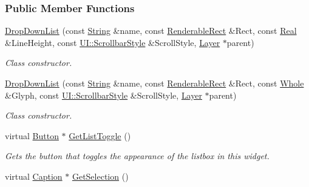 \subsubsection*{Public Member Functions}
\begin{DoxyCompactItemize}
\item 
\hyperlink{classMezzanine_1_1UI_1_1DropDownList_a62db40919995b782f115b45e740eec76}{DropDownList} (const \hyperlink{namespaceMezzanine_acf9fcc130e6ebf08e3d8491aebcf1c86}{String} \&name, const \hyperlink{structMezzanine_1_1UI_1_1RenderableRect}{RenderableRect} \&Rect, const \hyperlink{namespaceMezzanine_a726731b1a7df72bf3583e4a97282c6f6}{Real} \&LineHeight, const \hyperlink{namespaceMezzanine_1_1UI_a5998a9bf372a7e92605c0c461736e763}{UI::ScrollbarStyle} \&ScrollStyle, \hyperlink{classMezzanine_1_1UI_1_1Layer}{Layer} $\ast$parent)
\begin{DoxyCompactList}\small\item\em Class constructor. \item\end{DoxyCompactList}\item 
\hyperlink{classMezzanine_1_1UI_1_1DropDownList_af9e6380b4cc92d3e30a9e3c88449be75}{DropDownList} (const \hyperlink{namespaceMezzanine_acf9fcc130e6ebf08e3d8491aebcf1c86}{String} \&name, const \hyperlink{structMezzanine_1_1UI_1_1RenderableRect}{RenderableRect} \&Rect, const \hyperlink{namespaceMezzanine_adcbb6ce6d1eb4379d109e51171e2e493}{Whole} \&Glyph, const \hyperlink{namespaceMezzanine_1_1UI_a5998a9bf372a7e92605c0c461736e763}{UI::ScrollbarStyle} \&ScrollStyle, \hyperlink{classMezzanine_1_1UI_1_1Layer}{Layer} $\ast$parent)
\begin{DoxyCompactList}\small\item\em Class constructor. \item\end{DoxyCompactList}\item 
virtual \hyperlink{classMezzanine_1_1UI_1_1Button}{Button} $\ast$ \hyperlink{classMezzanine_1_1UI_1_1DropDownList_a6b8b0d0ba15389eb8a0c9c2b29d6bde4}{GetListToggle} ()
\begin{DoxyCompactList}\small\item\em Gets the button that toggles the appearance of the listbox in this widget. \item\end{DoxyCompactList}\item 
virtual \hyperlink{classMezzanine_1_1UI_1_1Caption}{Caption} $\ast$ \hyperlink{classMezzanine_1_1UI_1_1DropDownList_af70d48bd353cc533e123b0bc7c739632}{GetSelection} ()

\end{DoxyCompactItemize}
